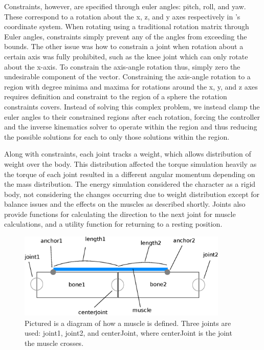Constraints, however, are specified through euler angles: pitch, roll, and yaw.  These correspond to a rotation about the x, z, and y axes respectively in \unity{}'s coordinate system.  When rotating using a traditional rotation matrix through Euler angles, constraints simply prevent any of the angles from exceeding the bounds.  The other issue was how to constrain a joint when rotation about a certain axis was fully prohibited, such as the knee joint which can only rotate about the x-axis.  To constrain the axis-angle rotation thus, simply zero the undesirable component of the vector.  Constraining the axis-angle rotation to a region with degree minima and maxima for rotations around the x, y, and z axes requires definition and constraint to the region of a sphere the rotation constraints covers.  Instead of solving this complex problem, we instead clamp the euler angles to their constrained regions after each rotation, forcing the controller and the inverse kinematics solver to operate within the region and thus reducing the possible solutions for each to only those solutions within the region.

Along with constraints, each joint tracks a weight, which allows distribution of weight over the body.  This distribution affected the torque simulation heavily as the torque of each joint resulted in a different angular momentum depending on the mass distribution.  The energy simulation considered the character as a rigid body, not considering the changes occurring due to weight distribution except for balance issues and the effects on the muscles as described shortly.  Joints also provide functions for calculating the direction to the next joint for muscle calculations, and a utility function for returning to a resting position.

\begin{figure}[ht]
	\centering
	\includegraphics[width=10cm]{images/spring_calc/spring_anchors.eps}
	\caption[Diagram of muscle definition showing anchor points and joints used for specification]{Pictured is a diagram of how a muscle is defined.  Three joints are used: joint1, joint2, and centerJoint, where centerJoint is the joint the muscle crosses.}
\end{figure}


